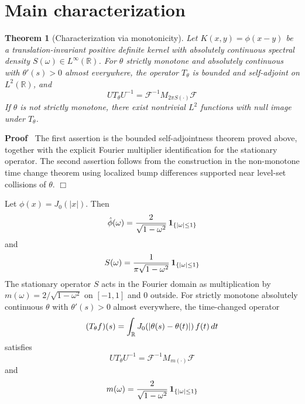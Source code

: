 \documentclass{article}
\newcommand{\cdummy}{\cdot}
\newenvironment{proof}{\noindent\textbf{Proof\ }}{\hspace*{\fill}$\Box$\medskip}
{\theorembodyfont{\rmfamily}\newtheorem{example}{Example}}
\newtheorem{theorem}{Theorem}
\begin{document}
\section{Main characterization}

\begin{theorem}
  [Characterization via monotonicity] Let $K (x, y) = \phi (x - y)$ be a
  translation-invariant positive definite kernel with absolutely continuous
  spectral density $S (\omega) \in L^{\infty} (\mathbb{R})$. For $\theta$
  strictly monotone and absolutely continuous with $\theta' (s) > 0$ almost
  everywhere, the operator $T_{\theta}$ is bounded and self-adjoint on $L^2
  (\mathbb{R})$, and
  \begin{equation}
    UT_{\theta} U^{- 1} =\mathcal{F}^{- 1} M_{2 \pi S (\cdummy)} \mathcal{F}
  \end{equation}
  If $\theta$ is not strictly monotone, there exist nontrivial $L^2$ functions
  with null image under $T_{\theta}$.
\end{theorem}

\begin{proof}
  The first assertion is the bounded self-adjointness theorem proved above,
  together with the explicit Fourier multiplier identification for the
  stationary operator. The second assertion follows from the construction in
  the non-monotone time change theorem using localized bump differences
  supported near level-set collisions of $\theta$.
\end{proof}

\begin{example}
   Let $\phi (x) = J_0 (|x|)$. Then
  \begin{equation}
    \hat{\phi} (\omega) = \frac{2}{\sqrt{1 - \omega^2}}  \hspace{0.17em}
    \textbf{1}_{\{| \omega | \le 1\}}
  \end{equation}
  and
  \begin{equation}
    S (\omega) = \frac{1}{\pi \sqrt{1 - \omega^2}}  \hspace{0.17em}
    \textbf{1}_{\{| \omega | \le 1\}}
  \end{equation}
  The stationary operator $S$ acts in the Fourier domain as multiplication by
  $m (\omega) = 2 / \sqrt{1 - \omega^2}$ on $[- 1, 1]$ and $0$ outside. For
  strictly monotone absolutely continuous $\theta$ with $\theta' (s) > 0$
  almost everywhere, the time-changed operator
  \begin{equation}
    (T_{\theta} f) (s) = \int_{\mathbb{R}} J_0 (| \theta (s) - \theta (t) |) 
    \hspace{0.17em} f (t)  \hspace{0.17em} dt
  \end{equation}
  satisfies
  \begin{equation}
    UT_{\theta} U^{- 1} =\mathcal{F}^{- 1} M_{m (\cdummy)} \mathcal{F} \text{}
  \end{equation}
  and
  \begin{equation}
    m (\omega) = \frac{2}{\sqrt{1 - \omega^2}}  \hspace{0.17em}
    \textbf{1}_{\{| \omega | \le 1\}}
  \end{equation}
\end{example}
\end{document}
